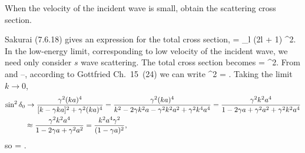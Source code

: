 \clearpage
\begin{problem}
	When the velocity of the incident wave is small, obtain the scattering cross section.
\end{problem}

\begin{solution}
	Sakurai (7.6.18) gives an expression for the total cross section,
	\beq
		\sigtot =  \sum_{l} (2l + 1) \sin^2\dell.
	\eeq
	In the low-energy limit, corresponding to low velocity of the incident wave, we need only consider $s$ wave scattering.  The total cross section becomes
	\beq
		\sigtot =  \sin^2\delo.
	\eeq
	From  and --, according to Gottfried Ch.~15~(24) we can write
	\beq
		\sin^2 \delo = .
	\eeq
	Taking the limit $k \to 0$,
	\begin{align*}
		\sin^2 \delta_0 &\to 
		\frac{\gamma^2 (ka)^4}{[k - \gamma ka]^2 + \gamma^2 (ka)^4}
		= \frac{\gamma^2 (ka)^4}{k^2 - 2 \gamma k^2 a - \gamma^2 k^2 a^2 + \gamma^2 k^4 a^4}
		= \frac{\gamma^2 k^2 a^4}{1 - 2 \gamma a + \gamma^2 a^2 + \gamma^2 k^2 a^4} \\
		&\approx \frac{\gamma^2 k^2 a^4}{1 - 2 \gamma a + \gamma^2 a^2}
		= \frac{k^2 a^4 \gamma^2}{(1 - \gamma a)^2},
	\end{align*}
	so
	\beq
		\sigtot = .
	\eeq
	\vfix
\end{solution}